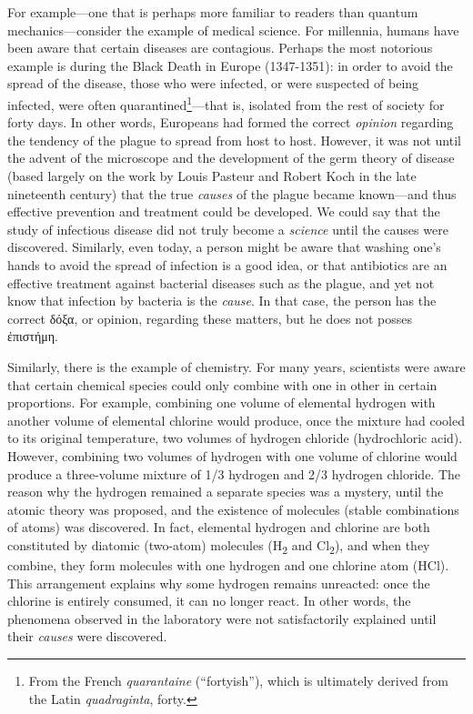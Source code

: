 \documentclass[
  12pt,
]{memoir}
\begin{document}
For example---one that is perhaps more familiar to readers than quantum
mechanics---consider the example of medical science. For millennia,
humans have been aware that certain diseases are contagious. Perhaps the
most notorious example is during the Black Death in Europe (1347-1351):
in order to avoid the spread of the disease, those who were infected, or
were suspected of being infected, were often
quarantined\footnote{From the French \emph{quarantaine} (``fortyish''),
  which is ultimately derived from the Latin \emph{quadraginta}, forty.}---that
is, isolated from the rest of society for forty days. In other words,
Europeans had formed the correct \emph{opinion} regarding the tendency
of the plague to spread from host to host. However, it was not until the
advent of the microscope and the development of the germ theory of
disease (based largely on the work by Louis Pasteur and Robert Koch in
the late nineteenth century) that the true \emph{causes} of the plague
became known---and thus effective prevention and treatment could be
developed. We could say that the study of infectious disease did not
truly become a \emph{science} until the causes were discovered.
Similarly, even today, a person might be aware that washing one's hands
to avoid the spread of infection is a good idea, or that antibiotics are
an effective treatment against bacterial diseases such as the plague,
and yet not know that infection by bacteria is the \emph{cause}. In that
case, the person has the correct δόξα, or opinion, regarding these
matters, but he does not posses ἐπιστήμη.

Similarly, there is the example of chemistry. For many years, scientists
were aware that certain chemical species could only combine with one in
other in certain proportions. For example, combining one volume of
elemental hydrogen with another volume of elemental chlorine would
produce, once the mixture had cooled to its original temperature, two
volumes of hydrogen chloride (hydrochloric acid). However, combining two
volumes of hydrogen with one volume of chlorine would produce a
three-volume mixture of 1/3 hydrogen and 2/3 hydrogen chloride. The
reason why the hydrogen remained a separate species was a mystery, until
the atomic theory was proposed, and the existence of molecules (stable
combinations of atoms) was discovered. In fact, elemental hydrogen and
chlorine are both constituted by diatomic (two-atom) molecules
(H\textsubscript{2} and Cl\textsubscript{2}), and when they combine,
they form molecules with one hydrogen and one chlorine atom (HCl). This
arrangement explains why some hydrogen remains unreacted: once the
chlorine is entirely consumed, it can no longer react. In other words,
the phenomena observed in the laboratory were not satisfactorily
explained until their \emph{causes} were discovered.
\end{document}
